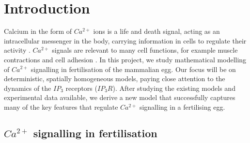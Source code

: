 \chapter{Introduction}

Calcium in the form of $Ca^{2+}$ ions is a life and death signal, acting as an intracellular messenger in the body, carrying information in cells to regulate their activity . {$Ca^{2+}$ signals are relevant to many cell functions, for example muscle contractions and cell adhesion . } In this project, we study mathematical modelling of $Ca^{2+}$ signalling in fertilisation of the mammalian egg. Our focus will be on deterministic, spatially homogeneous models, paying close attention to the dynamics of the $IP_3$ receptors ($IP_3R$). After studying the existing models and experimental data available, we derive a new model that successfully captures many of the key features that regulate $Ca^{2+}$ signalling in a fertilising egg. 

\section{$Ca^{2+}$ signalling in fertilisation}

